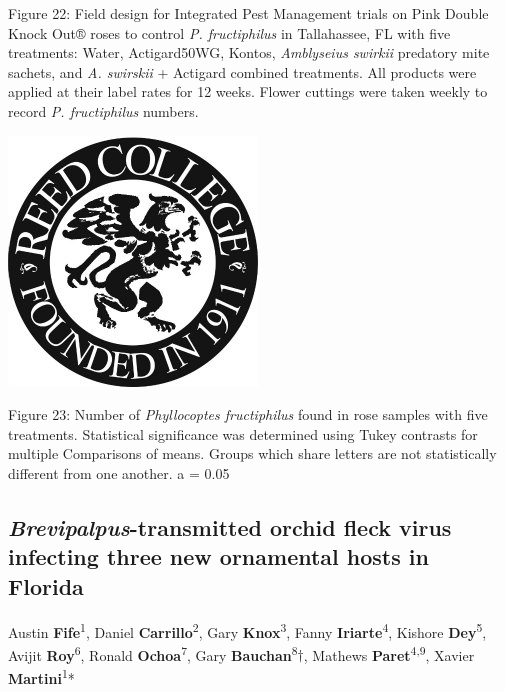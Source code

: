 \documentclass[12pt,final,CPage]{ufthesis}
\begin{document}
{  Figure 22: Field design for Integrated Pest Management trials on Pink Double Knock Out® roses to control \emph{P. fructiphilus} in Tallahassee, FL with five treatments: Water, Actigard50WG, Kontos, \emph{Amblyseius swirkii} predatory mite sachets, and \emph{A. swirskii} + Actigard combined treatments. All products were applied at their label rates for 12 weeks. Flower cuttings were taken weekly to record \emph{P. fructiphilus} numbers.
  \begin{center}\includegraphics[width=0.8\linewidth]{figure/reed} \end{center}

  Figure 23: Number of \emph{Phyllocoptes fructiphilus} found in rose samples with five treatments. Statistical significance was determined using Tukey contrasts for multiple Comparisons of means. Groups which share letters are not statistically different from one another. a = 0.05

  \hypertarget{brevipalpus-transmitted-orchid-fleck-virus-infecting-three-new-ornamental-hosts-in-florida}{%
  \subsection{\texorpdfstring{\emph{Brevipalpus}-transmitted orchid fleck virus infecting three new ornamental hosts in Florida}{Brevipalpus-transmitted orchid fleck virus infecting three new ornamental hosts in Florida}}\label{brevipalpus-transmitted-orchid-fleck-virus-infecting-three-new-ornamental-hosts-in-florida}}

  Austin \textbf{Fife}\textsuperscript{1}, Daniel \textbf{Carrillo}\textsuperscript{2}, Gary \textbf{Knox}\textsuperscript{3}, Fanny \textbf{Iriarte}\textsuperscript{4}, Kishore \textbf{Dey}\textsuperscript{5}, Avijit \textbf{Roy}\textsuperscript{6}, Ronald \textbf{Ochoa}\textsuperscript{7}, Gary \textbf{Bauchan}\textsuperscript{8}\(\dagger\), Mathews \textbf{Paret}\textsuperscript{4,9}, Xavier \textbf{Martini}\textsuperscript{1}*

}
\end{document}
